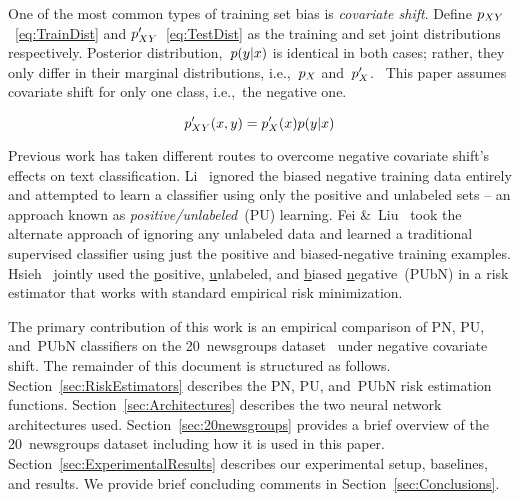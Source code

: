 \documentclass[]{subfiles}
\begin{document}
One of the most common types of training set bias is \textit{covariate shift}. Define $p_{XY}$~\eqref{eq:TrainDist} and ${p_{XY}'}$~\eqref{eq:TestDist} as the training and set joint distributions respectively.  Posterior distribution,~${p(y \vert x)}$ is identical in both cases; rather, they only differ in their marginal distributions, i.e.,~$p_{X}$ and~${p_{X}'}$.~\cite{Huang:2006}  This paper assumes covariate shift for only one class, i.e.,~the negative one.

\begin{equation}\label{eq:TestDist}
    p_{XY}'(x,y) = p_{X}'(x) p(y \vert x)
\end{equation}

Previous work has taken different routes to overcome negative covariate shift's effects on text classification.  Li\etal~\cite{Li:2010} ignored the biased negative training data entirely and attempted to learn a classifier using only the positive and unlabeled sets -- an approach known as \textit{positive\-/unlabeled}~(PU) learning.  Fei \&~Liu~\cite{Fei:2015} took the alternate approach of ignoring any unlabeled data and learned a traditional supervised classifier using just the positive and biased-negative training examples.  Hsieh\etal~\cite{Hsieh:2018} jointly used the \underline{p}ositive, \underline{u}nlabeled, and \underline{b}iased \underline{n}egative~(PUbN) in a risk estimator that works with standard empirical risk minimization.

The primary contribution of this work is an empirical comparison of PN, PU, and~PUbN classifiers on the 20~newsgroups dataset~\cite{20newsgroups} under negative covariate shift.  The remainder of this document is structured as follows.  Section~\ref{sec:RiskEstimators} describes the PN, PU, and~PUbN risk estimation functions. Section~\ref{sec:Architectures} describes the two neural network architectures used. Section~\ref{sec:20newsgroups} provides a brief overview of the 20~newsgroups dataset including how it is used in this paper. Section~\ref{sec:ExperimentalResults} describes our experimental setup, baselines, and results.  We provide brief concluding comments in Section~\ref{sec:Conclusions}.
\end{document}
